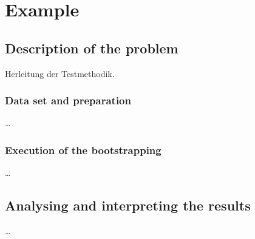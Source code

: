 
\chapter{Example} \label{Example}


\section{Description of the problem}
Herleitung der Testmethodik.

\subsection{Data set and preparation}
\ldots
\subsection{Execution of the bootstrapping}
\ldots
\section{Analysing and interpreting the results}
\ldots